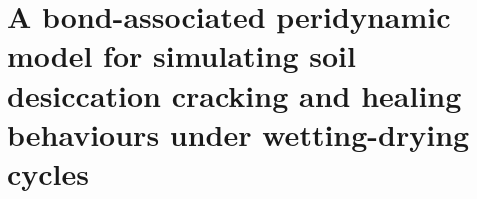 \chapter{A bond-associated peridynamic model for simulating soil desiccation cracking and healing behaviours under wetting-drying cycles}
\label{chap:six}